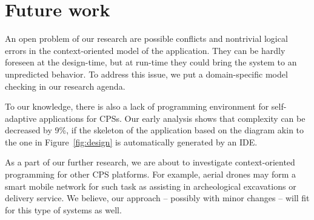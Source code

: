 \section{Future work}\label{sec:future}

An open problem of our research are possible conflicts and nontrivial logical
errors in the context-oriented model of the application. They can be hardly
foreseen at the design-time, but at run-time they could bring the system to an
unpredicted behavior. To address this issue, we put a domain-specific model
checking in our research agenda.

To our knowledge, there is also a lack of programming environment for
self-adaptive applications for CPSs. Our early analysis shows that complexity
can be decreased by 9\%, if the skeleton of the application based on the diagram
akin to the one in Figure~\ref{fig:design} is automatically generated by an IDE.

As a part of our further research, we are about to investigate context-oriented
programming for other CPS platforms. For example, aerial drones may form a smart
mobile network for such task as assisting in archeological excavations or
delivery service. We believe, our approach -- possibly with minor changes --
will fit for this type of systems as well.
